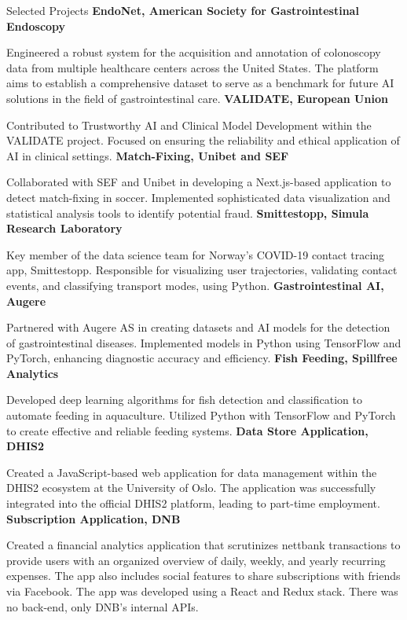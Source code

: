 \begin{rubric}{Selected Projects}
%
\entry*[2023]%
\textbf{EndoNet, American Society for Gastrointestinal Endoscopy} \par
Engineered a robust system for the acquisition and annotation of colonoscopy data from multiple healthcare centers across the United States. The platform aims to establish a comprehensive dataset to serve as a benchmark for future AI solutions in the field of gastrointestinal care.
%
\entry*[2023]%
\textbf{VALIDATE, European Union} \par 
Contributed to Trustworthy AI and Clinical Model Development within the VALIDATE project.
Focused on ensuring the reliability and ethical application of AI in clinical settings.
%
\entry*[2022]%
\textbf{Match-Fixing, Unibet and SEF} \par 
Collaborated with SEF and Unibet in developing a Next.js-based application to detect match-fixing in soccer.
Implemented sophisticated data visualization and statistical analysis tools to identify potential fraud.
%
\entry*[2020]%
\textbf{Smittestopp, Simula Research Laboratory} \par
Key member of the data science team for Norway's COVID-19 contact tracing app, Smittestopp.
Responsible for visualizing user trajectories, validating contact events, and classifying transport modes, using Python.
%
\entry*[2019]%
\textbf{Gastrointestinal AI, Augere} \par
Partnered with Augere AS in creating datasets and AI models for the detection of gastrointestinal diseases.
Implemented models in Python using TensorFlow and PyTorch, enhancing diagnostic accuracy and efficiency.
%
\entry*[2018]%
\textbf{Fish Feeding, Spillfree Analytics} \par
Developed deep learning algorithms for fish detection and classification to automate feeding in aquaculture.
Utilized Python with TensorFlow and PyTorch to create effective and reliable feeding systems.
%
\entry*[2017]%
\textbf{Data Store Application, DHIS2} \par
Created a JavaScript-based web application for data management within the DHIS2 ecosystem at the University of Oslo.
The application was successfully integrated into the official DHIS2 platform, leading to part-time employment.
%
\entry*[2017]%
\textbf{Subscription Application, DNB} \par
Created a financial analytics application that scrutinizes nettbank transactions to provide users with an organized overview of daily, weekly, and yearly recurring expenses. The app also includes social features to share subscriptions with friends via Facebook. The app was developed using a React and Redux stack. There was no back-end, only DNB's internal APIs.
%
\end{rubric}